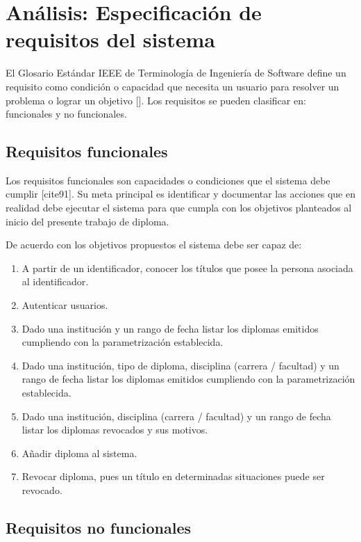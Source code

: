\section{Análisis: Especificación de requisitos del sistema}
El Glosario Estándar IEEE de Terminología de Ingeniería de Software define un requisito como condición o capacidad que necesita un usuario para resolver un problema o lograr un objetivo [\cite{95}]. Los requisitos se pueden clasificar en: funcionales y no funcionales.

\subsection{Requisitos funcionales}
Los requisitos funcionales son capacidades o condiciones que el sistema debe cumplir [cite{91}]. Su meta principal es identificar y documentar las acciones que en realidad debe ejecutar el sistema para que cumpla con los objetivos planteados al inicio del presente trabajo de diploma.

De acuerdo con los objetivos propuestos el sistema debe ser capaz de:

\begin{enumerate}
\item A partir de un identificador, conocer los títulos que posee la persona asociada al identificador.
\item Autenticar usuarios.
\item Dado una institución y un rango de fecha listar los diplomas emitidos cumpliendo con la parametrización establecida.
\item Dado una institución, tipo de diploma, disciplina (carrera / facultad) y un rango de fecha listar los diplomas emitidos cumpliendo con la parametrización establecida.
\item Dado una institución, disciplina (carrera / facultad) y un rango de fecha listar los diplomas revocados y sus motivos.
\item Añadir diploma al sistema.
\item Revocar diploma, pues un título en determinadas situaciones puede ser revocado.
\end{enumerate}

\subsection{Requisitos no funcionales}

